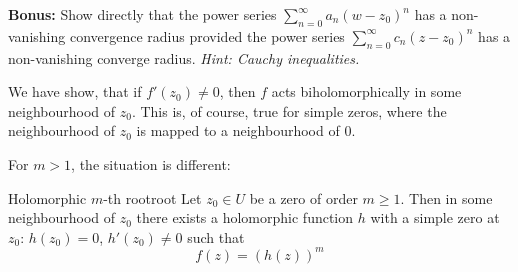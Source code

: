 \documentclass[a4paper,english]{article}
\begin{document}
\textbf{Bonus:}
Show directly that the power series $\sum_{n = 0}^{\infty} a_n (w - z_0)^n$ has a non-vanishing convergence radius provided the power series $\sum_{n = 0}^{\infty} c_n (z - z_0)^n$ has a non-vanishing converge radius.
\textit{Hint: Cauchy inequalities.}

We have show, that if $f'(z_0) \ne 0$, then $f$ acts biholomorphically in some neighbourhood of $z_0$.
This is, of course, true for simple zeros, where the neighbourhood of $z_0$ is mapped to a neighbourhood of 0.

For $m > 1$, the situation is different:

\begin{thm}{Holomorphic $m$-th root}{root}
    Let $z_0 \in U$ be a zero of order $m \ge 1$.
    Then in some neighbourhood of $z_0$ there exists a holomorphic function $h$ with a simple zero at $z_0$: $h(z_0) = 0$, $h'(z_0) \ne 0$ such that
    \begin{equation*}
        f(z) = (h(z))^m
    \end{equation*}
\end{thm}
\end{document}

